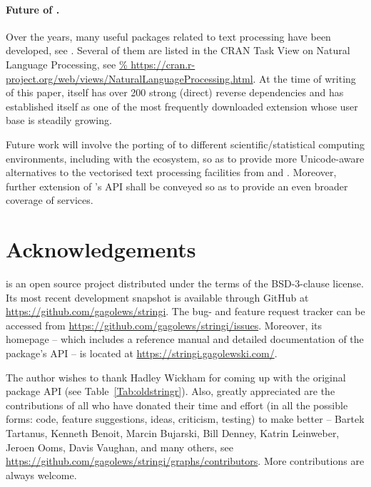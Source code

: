 \documentclass[nojss]{jss}\usepackage[]{graphicx}\usepackage[]{color}
\begin{document}
\paragraph{Future of .}
Over the years, many useful  packages related
to text processing have been developed, see \citep{textminingr,textr}.
Several of them are listed in the CRAN Task View
on Natural Language Processing, see \url{%
https://cran.r-project.org/web/views/NaturalLanguageProcessing.html}.
At the time of writing of this paper,
 itself has over 200 strong (direct) reverse dependencies
and has established itself as one of the most frequently downloaded
 extension whose user base is steadily growing.



Future work will involve the porting of  to different
scientific/statistical computing environments, including 
with the  \citep{numpy} ecosystem,
so as to provide more Unicode-aware
alternatives to the vectorised text processing
facilities from  and  \citep[Chap.~7]{pandas}.
Moreover, further extension of 's API shall be conveyed
so as to  provide an even broader coverage of  services.






\section*{Acknowledgements}

 is an open source project
distributed under the terms of the BSD-3-clause license.
Its most recent development snapshot is available through GitHub at
\url{https://github.com/gagolews/stringi}. The bug- and feature request
tracker can be accessed from
\url{https://github.com/gagolews/stringi/issues}.
Moreover, its homepage -- which includes a reference manual
and detailed documentation of the package's API --
is located at \url{https://stringi.gagolewski.com/}.

The author wishes to thank Hadley Wickham for coming
up with the original  package API (see Table~\ref{Tab:oldstringr}).
Also, greatly appreciated are the contributions of all who have donated their
time and effort (in all the possible forms: code, feature suggestions,
ideas, criticism, testing) to make  better --
Bartek Tartanus,
Kenneth Benoit,
Marcin Bujarski,
Bill Denney,
Katrin Leinweber,
Jeroen Ooms,
Davis Vaughan,
and many others,
see \url{https://github.com/gagolews/stringi/graphs/contributors}.
More contributions are always welcome.
\end{document}
